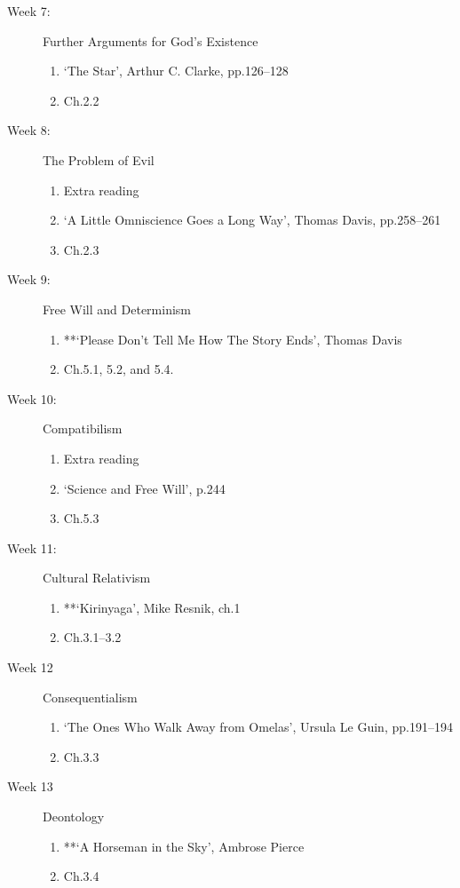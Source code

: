 \documentclass[article,oneside]{memoir}
\begin{document}
\begin{description}
\item[Week 7:] Further Arguments for God's Existence
\begin{enumerate}
\item `The Star', Arthur C. Clarke, pp.126--128
\item Ch.2.2
\end{enumerate}


\item[Week 8:] The Problem of Evil 
\begin{enumerate}
\item Extra reading
\item `A Little Omniscience Goes a Long Way', Thomas Davis, pp.258--261
\item Ch.2.3
\end{enumerate}




\item[Week 9:] Free Will and Determinism
\begin{enumerate}
\item **`Please Don't Tell Me How The Story Ends', Thomas Davis
\item Ch.5.1, 5.2, and 5.4.
\end{enumerate}

\item[Week 10:] Compatibilism
\begin{enumerate}
\item Extra reading
\item `Science and Free Will', p.244
\item Ch.5.3
\end{enumerate}


\item[Week 11:] Cultural Relativism
\begin{enumerate}
\item **`Kirinyaga', Mike Resnik, ch.1
\item Ch.3.1--3.2
\end{enumerate}
\item[Week 12]  Consequentialism 
\begin{enumerate}
\item  `The Ones Who Walk Away from Omelas', Ursula Le Guin, pp.191--194 
\item Ch.3.3
\end{enumerate}
\item[Week 13]  Deontology
\begin{enumerate}
\item **`A Horseman in the Sky', Ambrose Pierce
\item Ch.3.4


\end{enumerate}
\end{description}
\end{document}
